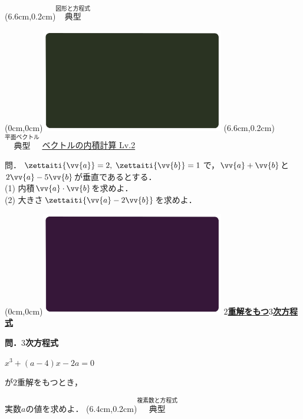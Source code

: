 \documentclass[10pt,
fleqn,
dvipdfmx,
uplatex
]{jsarticle}
\begin{document}
\at(6.6cm,0.2cm){\small\color{bradorange}$\overset{\text{図形と方程式}}{\text{典型}}$}



\newpage



\at(0cm,0cm){\includegraphics[width=8cm,bb=0 0 1920 1080]{./youtube/thumbnails/templates/smart_background/平面ベクトル.jpeg}}
\at(6.6cm,0.2cm){\small\color{bradorange}$\overset{\text{平面ベクトル}}{\text{典型}}$}
{\color{orange}\Large\underline{ベクトルの内積計算 Lv.2 }}\vspace{0.3zw}

\normalsize 
問．$\zettaiti{\vv {a}}=2,\;\zettaiti{\vv {b}}=1$で，$\vv {a}+\vv {b}$と$2\vv {a}-5\vv {b}$が垂直であるとする．\\
(1)  内積$\vv {a}\cdot \vv {b}$を求めよ．\\
(2)  大きさ$\zettaiti{\vv {a}-2\vv {b}}$を求めよ．\\



\newpage

\at(0cm,0cm){\includegraphics[width=8cm,bb=0 0 1920 1080]{./youtube/thumbnails/templates/smart_background/複素数と方程式.jpeg}}
{\color{orange}\bf\boldmath\Large\underline{$2$重解をもつ$3$次方程式}}\vspace{0.1zw}

\LARGE 
\bf\boldmath 問．$3$次方程式

\hspace{0.2zw}$x^3+\left(a-4\right)x-2a=0$

が$2$重解をもつとき，

\vspace{-0.2zw}
\hfill 実数$a$の値を求めよ．
\at(6.4cm,0.2cm){\small\color{bradorange}$\overset{\text{複素数と方程式}}{\text{典型}}$}
\end{document}
